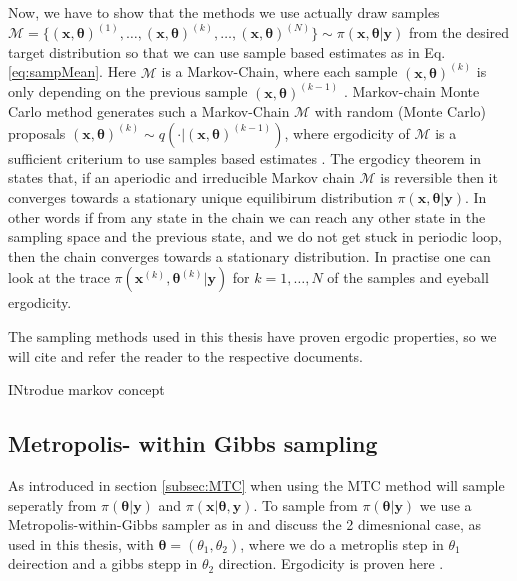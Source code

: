 Now, we have to show that the methods we use actually draw samples $ \mathcal{M} = \{ (\bm{x}, \bm{\theta} )^{(1)}, \dots, (\bm{x}, \bm{\theta} )^{(k)} , \dots,  (\bm{x}, \bm{\theta})^{(N)} \} \sim \pi(\bm{x},\bm{\theta}| \bm{y}) $ from the desired target distribution so that we can use sample based estimates as in Eq. \ref{eq:sampMean}.
Here $ \mathcal{M}$ is a Markov-Chain, where each sample $ (\bm{x}, \bm{\theta})^{(k)}$ is only depending on the previous sample  $ (\bm{x}, \bm{\theta})^{(k-1)}$ \cite{}.
Markov-chain Monte Carlo method generates such a Markov-Chain $\mathcal{M}$ with random (Monte Carlo) proposals $(\bm{x}, \bm{\theta})^{(k)} \sim q( \cdot |(\bm{x}, \bm{\theta})^{(k-1)})$, where ergodicity of $\mathcal{M}$ is a sufficient criterium to use samples based estimates \cite{tan2016LecNot, roberts2004general}.
The ergodicy theorem in \cite{tan2016LecNot} states that, if an aperiodic and irreducible Markov chain $\mathcal{M}$ is reversible then it converges towards a stationary unique equilibirum distribution $\pi(\bm{x},\bm{\theta}| \bm{y}) $.
In other words if from any state in the chain we can reach any other state in the sampling space and the previous state, and we do not get stuck in periodic loop, then the chain converges towards a stationary distribution.
In practise one can look at the trace $\pi(\bm{x}^{(k)},\bm{\theta}^{(k)}| \bm{y}) $ for $k = 1, \dots, N$ of the samples and eyeball ergodicity.

The sampling methods used in this thesis have proven ergodic properties, so we will cite and refer the reader to the respective documents.

INtrodue markov concept

\subsection{Metropolis- within Gibbs sampling}

As introduced in section \ref{subsec:MTC} when using the MTC method will sample seperatly from $\pi(\bm{\theta}| \bm{y})$ and $\pi(\bm{x}|\bm{\theta}, \bm{y}) $.
To sample from $\pi(\bm{\theta}| \bm{y})$ we use a Metropolis-within-Gibbs sampler as in \cite{fox2016fast} and discuss the 2 dimesnional case, as used in this thesis, with $\bm{\theta}  =( \theta_1 , \theta_2) $, where we do a metroplis step in $\theta_1$ deirection and a gibbs stepp in $\theta_2$ direction.
Ergodicity is proven here \cite{roberts2006harris}.

